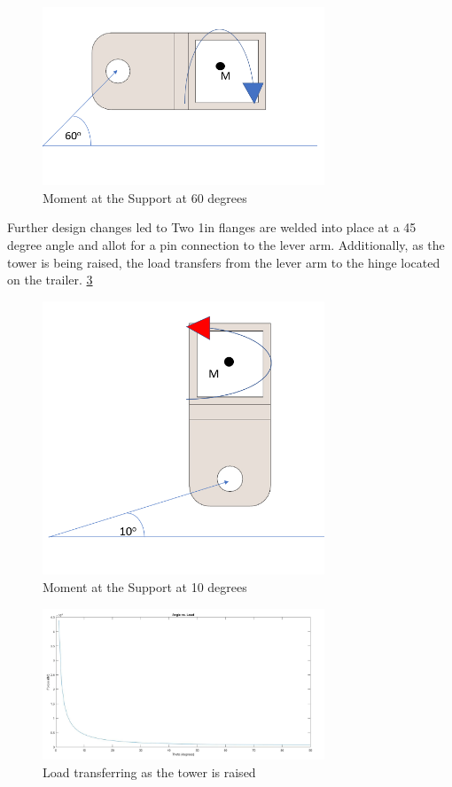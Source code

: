 \documentclass[10pt,a4paper]{article}
\begin{document}
\begin{figure}
	\centering
	\includegraphics[width=0.75\textwidth]{./figs/clevis_angle_60.png}
	\caption{Moment at the Support at 60 degrees}
	\label{fig:angle_60}
\end{figure}

Further design changes led to Two 1in flanges are welded into place at a 45 degree angle and allot for a pin connection to the lever arm. Additionally, as the tower is being raised, the load transfers from the lever arm to the hinge located on the trailer. \ref{fig:load_graph} \\
\begin{figure}
	\centering
	\includegraphics[width=0.75\textwidth]{./figs/clevis_angle_10.png}
	\caption{Moment at the Support at 10 degrees}
	\label{fig:angle_10}
\end{figure}
\begin{figure}
		\centering
		\includegraphics[width=0.75\textwidth]{./figs/load_graph.png}
		\caption{Load transferring as the tower is raised}
		\label{fig:load_graph}
\end{figure}
\end{document}

